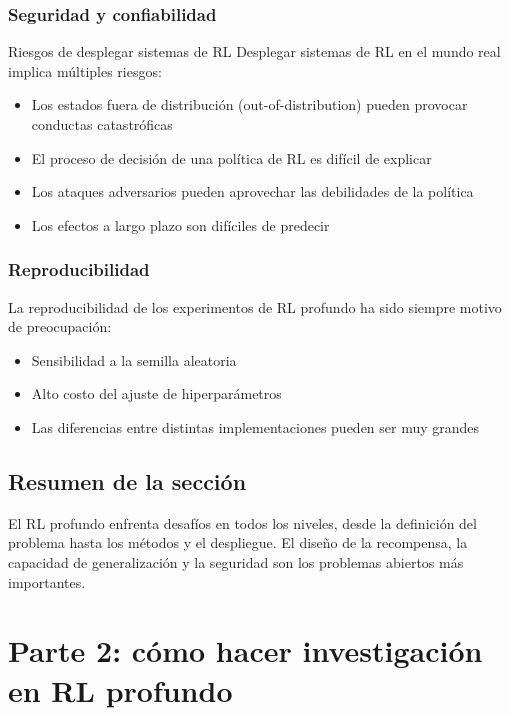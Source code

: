 \documentclass[a4paper]{article}
\begin{document}
\subsubsection{Seguridad y confiabilidad}

\begin{warningbox}{Riesgos de desplegar sistemas de RL}
Desplegar sistemas de RL en el mundo real implica múltiples riesgos:
\begin{itemize}
    \item Los estados fuera de distribución (out-of-distribution) pueden provocar conductas catastróficas
    \item El proceso de decisión de una política de RL es difícil de explicar
    \item Los ataques adversarios pueden aprovechar las debilidades de la política
    \item Los efectos a largo plazo son difíciles de predecir
\end{itemize}
\end{warningbox}

\subsubsection{Reproducibilidad}

La reproducibilidad de los experimentos de RL profundo ha sido siempre motivo de preocupación:
\begin{itemize}
    \item Sensibilidad a la semilla aleatoria
    \item Alto costo del ajuste de hiperparámetros
    \item Las diferencias entre distintas implementaciones pueden ser muy grandes
\end{itemize}

\subsection{Resumen de la sección}

El RL profundo enfrenta desafíos en todos los niveles, desde la definición del problema hasta los métodos y el despliegue. El diseño de la recompensa, la capacidad de generalización y la seguridad son los problemas abiertos más importantes.
\section{Parte 2: cómo hacer investigación en RL profundo}
\end{document}
